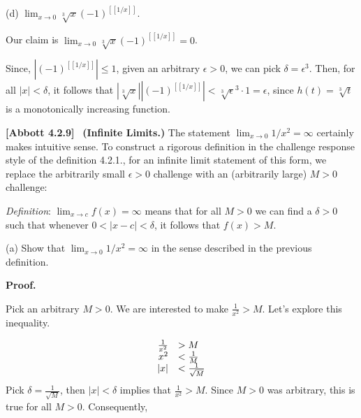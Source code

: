 \documentclass[10pt]{article}
\begin{document}
(d) $\displaystyle \lim _{x\rightarrow 0} \sqrt[3] x( -1)^{[[ 1/x]]}$.



Our claim is $\displaystyle \lim _{x\rightarrow 0} \sqrt[3] x( -1)^{[[ 1/x]]} =0$.



Since, $\displaystyle |( -1)^{[[ 1/x]]} |\leq 1$, given an arbitrary $\displaystyle \epsilon  >0$, we can pick $\displaystyle \delta =\epsilon ^{3}$. Then, for all $\displaystyle |x|< \delta $, it follows that $\displaystyle |\sqrt[3] x||( -1)^{[[ 1/x]]} |< \sqrt[3] \epsilon ^{3} \cdot 1=\epsilon $, since $\displaystyle h( t) =\sqrt[3] t$ is a monotonically increasing function. 



\textbf{[Abbott 4.2.9]} \ \textbf{(Infinite Limits.)} The statement $\displaystyle \lim _{x\rightarrow 0} 1/x^{2} =\infty $ certainly makes intuitive sense. To construct a rigorous definition in the challenge response style of the definition 4.2.1., for an infinite limit statement of this form, we replace the arbitrarily small $\displaystyle \epsilon  >0$ challenge with an (arbitrarily large) $\displaystyle M >0$ challenge:



\textit{Definition}: $\displaystyle \lim _{x\rightarrow c} f( x) =\infty $ means that for all $\displaystyle M >0$ we can find a $\displaystyle \delta  >0$ such that whenever $\displaystyle 0< |x-c|< \delta $, it follows that $\displaystyle f( x)  >M$.



(a) Show that $\displaystyle \lim _{x\rightarrow 0} 1/x^{2} =\infty $ in the sense described in the previous definition.



\textbf{Proof.}



Pick an arbitrary $\displaystyle M >0$. We are interested to make $\displaystyle \frac{1}{x^{2}}  >M$. Let's explore this inequality.


\begin{equation*}
\begin{array}{ r l }
\frac{1}{x^{2}} &  >M\\
x^{2} & < \frac{1}{M}\\
|x| & < \frac{1}{\sqrt{M}}
\end{array}
\end{equation*}
Pick $\displaystyle \delta =\frac{1}{\sqrt{M}}$, then $\displaystyle |x|< \delta $ implies that $\displaystyle \frac{1}{x^{2}}  >M$. Since $\displaystyle M >0$ was arbitrary, this is true for all $\displaystyle M >0$. Consequently,
\end{document}
